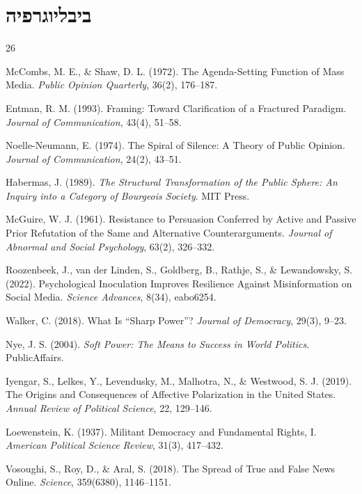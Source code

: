 \chapter*{ביבליוגרפיה}

\begin{thebibliography}{26}

McCombs, M. E., \& Shaw, D. L. (1972). The Agenda-Setting Function of Mass Media. \emph{Public Opinion Quarterly}, 36(2), 176--187.

Entman, R. M. (1993). Framing: Toward Clarification of a Fractured Paradigm. \emph{Journal of Communication}, 43(4), 51--58.

Noelle-Neumann, E. (1974). The Spiral of Silence: A Theory of Public Opinion. \emph{Journal of Communication}, 24(2), 43--51.

Habermas, J. (1989). \emph{The Structural Transformation of the Public Sphere: An Inquiry into a Category of Bourgeois Society}. MIT Press.

McGuire, W. J. (1961). Resistance to Persuasion Conferred by Active and Passive Prior Refutation of the Same and Alternative Counterarguments. \emph{Journal of Abnormal and Social Psychology}, 63(2), 326--332.

Roozenbeek, J., van der Linden, S., Goldberg, B., Rathje, S., \& Lewandowsky, S. (2022). Psychological Inoculation Improves Resilience Against Misinformation on Social Media. \emph{Science Advances}, 8(34), eabo6254.

Walker, C. (2018). What Is ``Sharp Power''? \emph{Journal of Democracy}, 29(3), 9--23.

Nye, J. S. (2004). \emph{Soft Power: The Means to Success in World Politics}. PublicAffairs.

Iyengar, S., Lelkes, Y., Levendusky, M., Malhotra, N., \& Westwood, S. J. (2019). The Origins and Consequences of Affective Polarization in the United States. \emph{Annual Review of Political Science}, 22, 129--146.

Loewenstein, K. (1937). Militant Democracy and Fundamental Rights, I. \emph{American Political Science Review}, 31(3), 417--432.

Vosoughi, S., Roy, D., \& Aral, S. (2018). The Spread of True and False News Online. \emph{Science}, 359(6380), 1146--1151.


\end{thebibliography}
